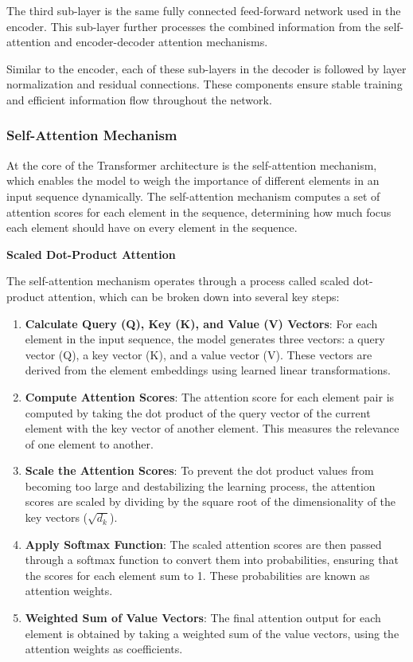 The third sub-layer is the same fully connected feed-forward network used in the encoder. This sub-layer further processes the combined information from the self-attention and encoder-decoder attention mechanisms.

Similar to the encoder, each of these sub-layers in the decoder is followed by layer normalization and residual connections. These components ensure stable training and efficient information flow throughout the network.
\vspace{10pt}

\subsubsection{Self-Attention Mechanism}
At the core of the Transformer architecture is the self-attention mechanism, which enables the model to weigh the importance of different elements in an input sequence dynamically. The self-attention mechanism computes a set of attention scores for each element in the sequence, determining how much focus each element should have on every element in the sequence.
\vspace{10pt}

\noindent\textbf{Scaled Dot-Product Attention}

\noindent The self-attention mechanism operates through a process called scaled dot-product attention, which can be broken down into several key steps:

\begin{enumerate}
    \item \textbf{Calculate Query (Q), Key (K), and Value (V) Vectors}: For each element in the input sequence, the model generates three vectors: a query vector (Q), a key vector (K), and a value vector (V). These vectors are derived from the element embeddings using learned linear transformations.
    \item \textbf{Compute Attention Scores}: The attention score for each element pair is computed by taking the dot product of the query vector of the current element with the key vector of another element. This measures the relevance of one element to another.
    \item \textbf{Scale the Attention Scores}: To prevent the dot product values from becoming too large and destabilizing the learning process, the attention scores are scaled by dividing by the square root of the dimensionality of the key vectors ($\sqrt{d_k}$).
    \item \textbf{Apply Softmax Function}: The scaled attention scores are then passed through a softmax function to convert them into probabilities, ensuring that the scores for each element sum to 1. These probabilities are known as attention weights.
    \item \textbf{Weighted Sum of Value Vectors}: The final attention output for each element is obtained by taking a weighted sum of the value vectors, using the attention weights as coefficients.
\end{enumerate}

